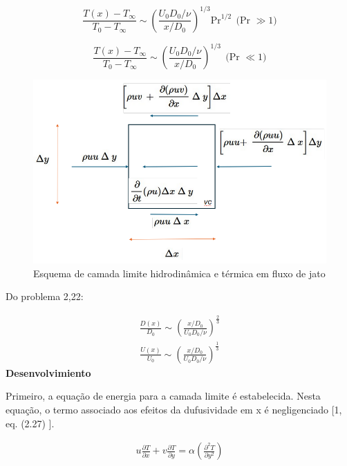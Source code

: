 \documentclass[12pt]{article}
\begin{document}
\begin{equation}
	\frac{T(x) - T_\infty}{T_0 - T_\infty} \sim \left( \frac{U_0 D_0 / \nu}{x / D_0} \right)^{1/3} \text{Pr}^{1/2} \ \ \text{(Pr } \gg 1 \text{)}
\end{equation}


\begin{equation}
	\frac{T(x) - T_\infty}{T_0 - T_\infty} \sim \left( \frac{U_0 D_0 / \nu}{x / D_0} \right)^{1/3} \ \ \text{(Pr } \ll 1 \text{)}
\end{equation}

 
\begin{figure}[H]
	\centering
	\includegraphics[width=.65\textwidth]{Figures/1_2}
	\caption{Esquema de camada limite hidrodinâmica e térmica em fluxo de jato}
\end{figure}

Do problema 2,22:

\begin{equation}
	\begin{aligned}
		\frac{D(x)}{D_{0}} \sim \left( \frac{x/D_{0}}{U_{0}D_{0}/\nu} \right) ^{\frac{2}{3}}
	\end{aligned}	
\end{equation}
\begin{equation}
	\begin{aligned}
		\frac{U(x)}{U_{0}} \sim \left( \frac{x/D_{0}}{U_{0}D_{0}/\nu} \right) ^{\frac{1}{3}}
	\end{aligned}	
\end{equation}
\textbf{Desenvolvimiento}

Primeiro, a equação de energia para a camada limite é estabelecida. Nesta equação, o termo associado aos efeitos da dufusividade em x é negligenciado [1, eq. (2.27) ].

\begin{equation}
	\begin{aligned}
		u\frac{\partial T}{\partial x} + v\frac{\partial T}{\partial y} = \alpha\left( \frac{\partial^{2} T}{\partial y^{2}}\right)
	\end{aligned}
\end{equation}
\end{document}
